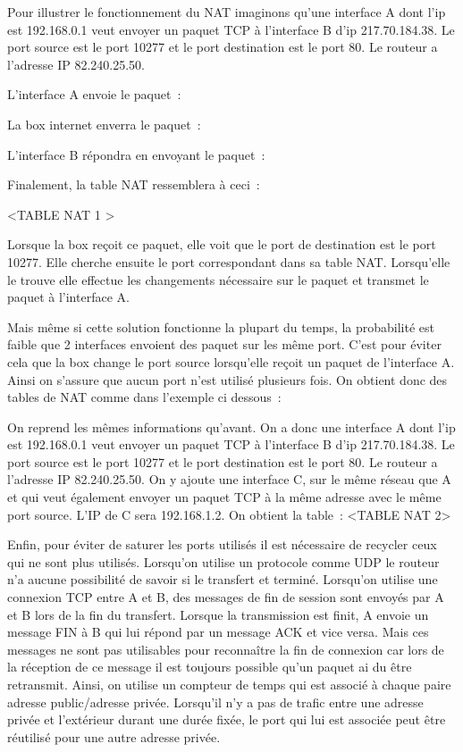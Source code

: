 Pour illustrer le fonctionnement du NAT imaginons qu'une interface A dont l'ip
est 192.168.0.1 veut envoyer un paquet TCP à l'interface B d'ip 217.70.184.38.
Le port source est le port 10277 et le port destination est le port 80. Le
routeur a l'adresse IP  82.240.25.50.

L'interface A envoie le paquet :

La box internet enverra le paquet : 

L'interface B répondra en envoyant le paquet :

Finalement, la table NAT ressemblera à ceci : 

<TABLE NAT 1 > 

Lorsque la box reçoit ce paquet, elle voit que le port de destination est le
port 10277. Elle cherche ensuite le port correspondant dans sa table NAT.
Lorsqu'elle le trouve elle effectue les changements nécessaire sur le paquet et
transmet le paquet à l'interface A.

Mais même si cette solution fonctionne la plupart du temps, la probabilité est
faible que 2 interfaces envoient des paquet sur les même port. C'est pour
éviter cela que la box change le port source lorsqu'elle reçoit un paquet de
l'interface A. Ainsi on s'assure que aucun port n'est utilisé plusieurs fois.
On obtient donc des tables de NAT comme dans l'exemple ci dessous :

On reprend les mêmes informations qu'avant. On a donc une interface A dont l'ip
est 192.168.0.1 veut envoyer un paquet TCP à l'interface B d'ip 217.70.184.38.
Le port source est le port 10277 et le port destination est le port 80. Le
routeur a l'adresse IP  82.240.25.50.
On y ajoute une interface C, sur le même réseau que A et qui veut également
envoyer un paquet TCP à la même adresse avec le même port source. L'IP de C
sera 192.168.1.2.
On obtient la table :
<TABLE NAT 2>

Enfin, pour éviter de saturer les ports utilisés il est nécessaire de recycler
 ceux qui ne sont plus utilisés. Lorsqu'on utilise un protocole comme UDP le
routeur n'a aucune possibilité de savoir si le transfert et terminé. Lorsqu'on
utilise une connexion TCP entre A et B, des messages de fin de session sont
envoyés par A et B lors de la fin du transfert. Lorsque la transmission est
finit, A envoie un message FIN à B qui lui répond par un message ACK et vice
versa. Mais ces messages ne sont pas utilisables pour reconnaître la fin de
connexion car lors de la réception de ce message il est toujours possible qu'un
paquet ai du être retransmit. Ainsi, on utilise un compteur de temps qui est
associé à chaque paire adresse public/adresse privée. Lorsqu'il n'y a pas de
trafic entre une adresse privée et l'extérieur durant une durée fixée, le port
qui lui est associée peut être réutilisé pour une autre adresse privée.


